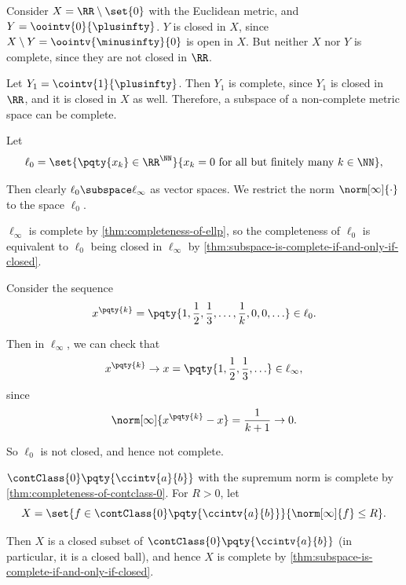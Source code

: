 \begin{example}
    Consider \(X = \RR \setminus \set{0}\) with the Euclidean metric, and \(Y = \oointv{0}{\plusinfty}\). \(Y\) is closed in \(X\), since \(X \setminus Y = \oointv{\minusinfty}{0}\) is open in \(X\). But neither \(X\) nor \(Y\) is complete, since they are not closed in \(\RR\).

    Let \(Y_1 = \cointv{1}{\plusinfty}\). Then \(Y_1\) is complete, since \(Y_1\) is closed in \(\RR\), and it is closed in \(X\) as well. Therefore, a subspace of a non-complete metric space can be complete.
\end{example}

\begin{example}
    Let
    \[
        \ell_0 = \set{\pqty{x_k} \in \RR^\NN}{x_k = 0 \text{ for all but finitely many } k \in \NN},
    \]

    Then clearly \(\ell_0 \subspace \ell_{\infty}\) as vector spaces. We restrict the norm \(\norm[\infty]{\cdot}\) to the space \(\ell_0\).

    \(\ell_{\infty}\) is complete by \autoref{thm:completeness-of-ellp}, so the completeness of \(\ell_0\) is equivalent to \(\ell_0\) being closed in \(\ell_{\infty}\) by \autoref{thm:subspace-is-complete-if-and-only-if-closed}.

    Consider the sequence
    \[
        x^{\pqty{k}} = \pqty{1, \frac{1}{2}, \frac{1}{3}, \ldots, \frac{1}{k}, 0, 0, \ldots} \in \ell_0.
    \]

    Then in \(\ell_{\infty}\), we can check that
    \[
        x^{\pqty{k}} \to x = \pqty{1, \frac{1}{2}, \frac{1}{3}, \ldots} \in \ell_{\infty},
    \]
    since
    \[
        \norm[\infty]{x^{\pqty{k}} - x} = \frac{1}{k + 1} \to 0.
    \]

    So \(\ell_0\) is not closed, and hence not complete.
\end{example}

\begin{example}
    \(\contClass{0}\pqty{\ccintv{a}{b}}\) with the supremum norm is complete by \autoref{thm:completeness-of-contclass-0}. For \(R > 0\), let
    \[
        X = \set{f \in \contClass{0}\pqty{\ccintv{a}{b}}}{\norm[\infty]{f} \leq R}.
    \]

    Then \(X\) is a closed subset of \(\contClass{0}\pqty{\ccintv{a}{b}}\) (in particular, it is a closed ball), and hence \(X\) is complete by \autoref{thm:subspace-is-complete-if-and-only-if-closed}.
\end{example}

